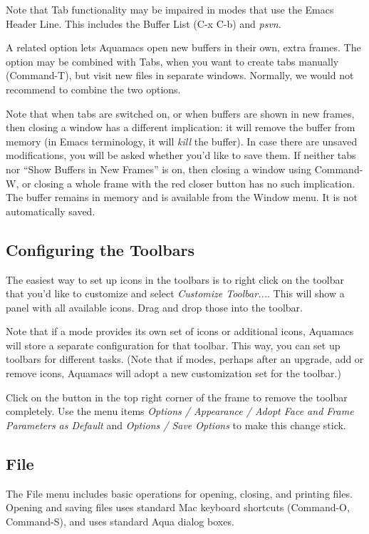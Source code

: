 \documentclass[11pt,letterpaper]{article}
\begin{document}
Note that Tab functionality may be impaired in modes that use the Emacs Header Line.  This includes the Buffer List (C-x C-b) and \emph{psvn}.

A related option lets Aquamacs open new buffers in their own, extra frames.  The option may be combined with Tabs, when you want to create tabs manually (Command-T), but visit new files in separate windows.  Normally, we would not recommend to combine the two options. 

Note that when tabs are switched on, or when buffers are shown in new frames, then closing a window has a different implication: it will remove the buffer from memory (in Emacs terminology, it will \emph{kill} the buffer).  In case there are unsaved modifications, you will be asked whether you'd like to save them. 
If neither tabs nor ``Show Buffers in New Frames'' is on, then closing a window using Command-W, or closing a whole frame with the red closer button has no such implication.  The buffer remains in memory and is available from the Window menu.  It is not automatically saved.

\subsection{Configuring the Toolbars}

The easiest way to set up icons in the toolbars is to right click on the toolbar that you'd like to customize and select \emph{Customize Toolbar...}.  This will show a panel with all available icons.  Drag and drop those into the toolbar.

Note that if a mode provides its own set of icons or additional icons, Aquamacs will store a separate configuration for that toolbar.  This way, you can set up toolbars for different tasks.  (Note that if modes, perhaps after an upgrade, add or remove icons, Aquamacs will adopt a new customization set for the toolbar.)

Click on the button in the top right corner of the frame to remove the toolbar completely.  Use the menu items \emph{Options / Appearance / Adopt Face and Frame Parameters as Default} and \emph{Options / Save Options}  to make this change stick.


\subsection{File}
The File menu includes basic operations for opening, closing, and printing files. Opening and saving files uses standard Mac keyboard shortcuts (Command-O, Command-S), and uses standard Aqua dialog boxes.
\end{document}
